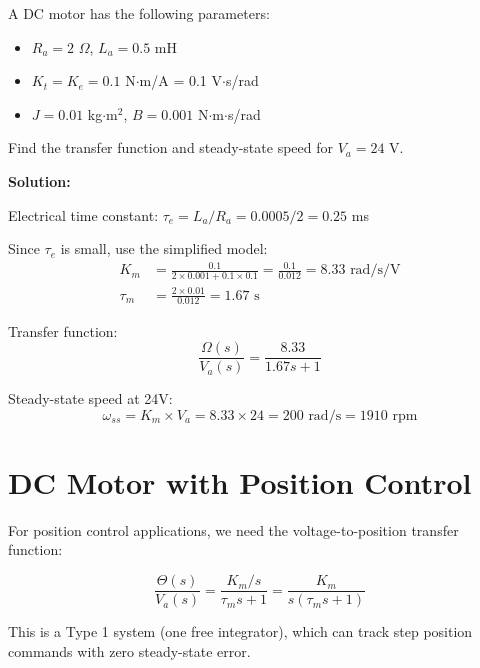 \begin{examplebox}[title=Example 1.8: DC Motor Analysis]
A DC motor has the following parameters:
\begin{itemize}
    \item $R_a = 2$ $\Omega$, $L_a = 0.5$ mH
    \item $K_t = K_e = 0.1$ N$\cdot$m/A = 0.1 V$\cdot$s/rad
    \item $J = 0.01$ kg$\cdot$m$^2$, $B = 0.001$ N$\cdot$m$\cdot$s/rad
\end{itemize}

Find the transfer function and steady-state speed for $V_a = 24$ V.

\textbf{Solution:}

Electrical time constant: $\tau_e = L_a/R_a = 0.0005/2 = 0.25$ ms

Since $\tau_e$ is small, use the simplified model:
\begin{align}
K_m &= \frac{0.1}{2 \times 0.001 + 0.1 \times 0.1} = \frac{0.1}{0.012} = 8.33 \text{ rad/s/V} \\
\tau_m &= \frac{2 \times 0.01}{0.012} = 1.67 \text{ s}
\end{align}

Transfer function:
\begin{equation}
\frac{\Omega(s)}{V_a(s)} = \frac{8.33}{1.67s + 1}
\end{equation}

Steady-state speed at 24V:
\begin{equation}
\omega_{ss} = K_m \times V_a = 8.33 \times 24 = 200 \text{ rad/s} = 1910 \text{ rpm}
\end{equation}
\end{examplebox}

\section{DC Motor with Position Control}
\label{sec:motor_position}

For position control applications, we need the voltage-to-position transfer function:

\begin{equation}
\frac{\Theta(s)}{V_a(s)} = \frac{K_m/s}{\tau_m s + 1} = \frac{K_m}{s(\tau_m s + 1)}
\end{equation}

This is a Type 1 system (one free integrator), which can track step position commands with zero steady-state error.

